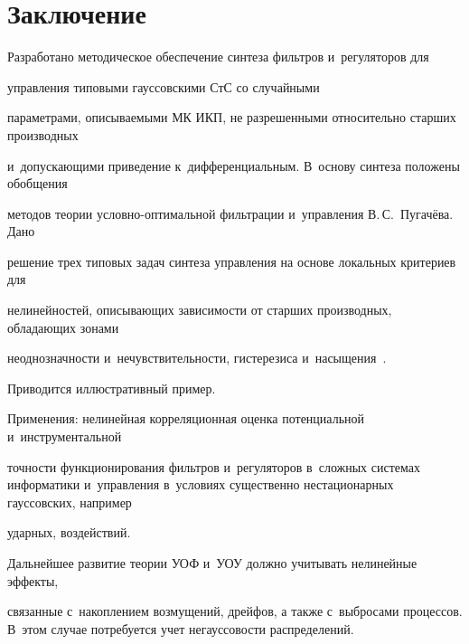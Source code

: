 \section{Заключение}



Разработано методическое обеспечение синтеза фильтров и~регуляторов для 

управления типовыми гауссовскими СтС со случайными 

параметрами, описываемыми МК ИКП, не разрешенными относительно старших производных 

и~допускающими приведение к~дифференциальным. В~основу синтеза положены обобщения 

методов теории услов\-но-оп\-ти\-маль\-ной фильт\-ра\-ции и~управ\-ле\-ния В.\,С.~Пугачёва. Дано 

решение трех типовых задач синтеза управления на основе локальных критериев для 

нелинейностей, описывающих зависимости от старших производных, обладающих зонами 

неоднозначности и~нечувствительности, гистерезиса и~насыщения~\cite{14-sin, 16-sin}.  

Приводится иллюстративный пример.



Применения: нелинейная корреляционная оценка потенциальной и~инструментальной 

точности функционирования фильтров и~регуляторов в~сложных сис\-те\-мах информатики и~управления в~условиях существенно нестационарных гауссовских, например 

ударных, воздействий.



Дальнейшее развитие теории УОФ и~УОУ должно учитывать нелинейные эффекты, 

связанные с~накоплением возмущений, дрейфов, а также с~выбросами процессов. В~этом случае потребуется учет негауссовости распределений.





